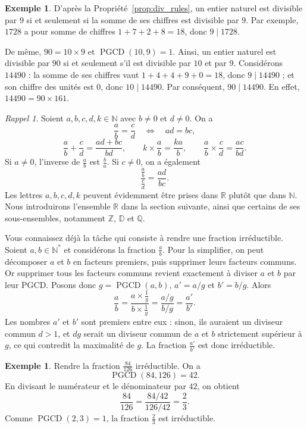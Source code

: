 \documentclass[12pt,a4paper]{article}
\theoremstyle{plain}
\theoremstyle{definition}
\newtheorem{example}[theorem]{Exemple}
\theoremstyle{remark}
\newtheorem*{recall}{Rappel}
\DeclareMathOperator{\pgcd}{PGCD}
\begin{document}
\begin{example}
  D'après la Propriété~\ref{prop:div_rules}, un entier naturel est divisible
  par $9$ si et seulement si la somme de ses chiffres est divisible par $9$.
  Par exemple, $1728$ a pour somme de chiffres $1+7+2+8=18$, donc
  $9\mid1728$.

  De même, $90=10\times9$ et $\pgcd(10,9)=1$. Ainsi, un entier naturel est
  divisible par $90$ si et seulement s'il est divisible par $10$ et par $9$.
  Considérons $14490$ : la somme de ses chiffres vaut
  $1+4+4+9+0=18$, donc $9\mid14490$ ; et son chiffre des unités est $0$,
  donc $10\mid14490$. Par conséquent, $90\mid14490$. En effet,
  $14490=90\times161$.
\end{example}

\begin{recall}
  Soient $a,b,c,d,k\in\mathbb{N}$ avec $b\ne0$ et $d\ne0$. On a
  \[
    \frac{a}{b}=\frac{c}{d}
    \quad\Longleftrightarrow\quad
    ad=bc,
  \]
  \[
    \frac{a}{b}+\frac{c}{d}=\frac{ad+bc}{bd},\qquad
    k\times\frac{a}{b}=\frac{ka}{b},\qquad
    \frac{a}{b}\times\frac{c}{d}=\frac{ac}{bd}.
  \]
  Si $a\ne0$, l'inverse de $\frac{a}{b}$ est $\frac{b}{a}$.
  Si $c\ne0$, on a également
  \[
    \frac{\frac{a}{b}}{\frac{c}{d}}=\frac{ad}{bc}.
  \]
  Les lettres $a,b,c,d,k$ peuvent
  évidemment être prises dans $\mathbb{R}$ plutôt que dans $\mathbb{N}$.
  Nous introduirons l'ensemble $\mathbb{R}$ dans la section suivante, ainsi
  que certains de ses sous-ensembles, notamment $\mathbb{Z}$, $\mathbb{D}$
  et $\mathbb{Q}$.
\end{recall}

Vous connaissez déjà la tâche qui consiste à rendre une
fraction irréductible. Soient $a,b\in\mathbb{N}^*$ et considérons la
fraction $\frac{a}{b}$. Pour la simplifier, on peut décomposer $a$ et $b$
en facteurs premiers, puis supprimer leurs facteurs communs. Or supprimer
tous les facteurs communs revient exactement à diviser $a$ et $b$ par leur
PGCD. Posons donc $g=\pgcd(a,b)$, $a'=a/g$ et $b'=b/g$. Alors
\[
  \frac{a}{b}
  = \frac{a \times \frac{1}{g}}{b \times \frac{1}{g}}
  =\frac{a/g}{b/g}
  =\frac{a'}{b'}.
\]
Les nombres $a'$ et $b'$ sont premiers entre eux : sinon, ils auraient un
diviseur commun $d>1$, et $dg$ serait un diviseur commun de $a$ et $b$
strictement supérieur à $g$, ce qui contredit la maximalité de $g$. La
fraction $\frac{a'}{b'}$ est donc irréductible.

\begin{example}
  Rendre la fraction $\frac{84}{126}$ irréductible. On a
  \[
    \pgcd(84,126)=42.
  \]
  En divisant le numérateur et le dénominateur par $42$, on obtient
  \[
    \frac{84}{126}
    =\frac{84/42}{126/42}
    =\frac{2}{3}.
  \]
  Comme $\pgcd(2,3)=1$, la fraction $\frac{2}{3}$ est irréductible.
\end{example}
\end{document}
